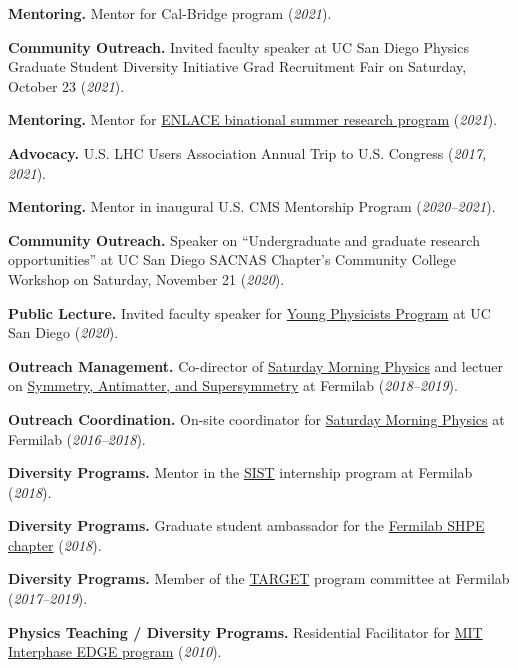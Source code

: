 \documentclass[11pt]{res}
\begin{document}
\begin{resume}
  \textbf{Mentoring.} Mentor for Cal-Bridge program (\textit{2021}).

  \textbf{Community Outreach.} Invited faculty speaker at UC San Diego Physics Graduate Student Diversity Initiative Grad Recruitment Fair on Saturday, October 23 (\textit{2021}).

  \textbf{Mentoring.} Mentor for \href{http://resilientmaterials.ucsd.edu/ENLACE}{ENLACE binational summer research program} (\textit{2021}).

  \textbf{Advocacy.} U.S. LHC Users Association Annual Trip to U.S. Congress (\textit{2017, 2021}).

  \textbf{Mentoring.} Mentor in inaugural U.S. CMS Mentorship Program (\textit{2020--2021}).

  \textbf{Community Outreach.} Speaker on ``Undergraduate and graduate research opportunities'' at UC San Diego SACNAS Chapter's Community College Workshop on Saturday, November 21 (\textit{2020}).

  \textbf{Public Lecture.} Invited faculty speaker for \href{http://ypp.ucsd.edu/}{Young Physicists Program} at UC San Diego (\textit{2020}).

  \textbf{Outreach Management.} Co-director of \href{http://saturdaymorningphysics.fnal.gov/}{Saturday Morning Physics} and lectuer on \href{http://saturdaymorningphysics.fnal.gov/fall-session-2018/}{Symmetry, Antimatter, and Supersymmetry} at Fermilab (\textit{2018--2019}).

  \textbf{Outreach Coordination.} On-site coordinator for \href{http://saturdaymorningphysics.fnal.gov/}{Saturday Morning Physics} at Fermilab (\textit{2016--2018}).

  \textbf{Diversity Programs.} Mentor in the \href{http://diversity.fnal.gov/sist/}{SIST} internship program at Fermilab (\textit{2018}).

  \textbf{Diversity Programs.} Graduate student ambassador for the \href{http://diversity.fnal.gov/fshpe/}{Fermilab SHPE chapter} (\textit{2018}).

  \textbf{Diversity Programs.} Member of the \href{http://diversity.fnal.gov/target/}{TARGET} program committee at Fermilab (\textit{2017--2019}).

  \textbf{Physics Teaching / Diversity Programs.} Residential Facilitator for \href{http://ome.mit.edu/programs-services/program-overview}{MIT Interphase EDGE program} (\textit{2010}).



\end{resume}
\end{document}
